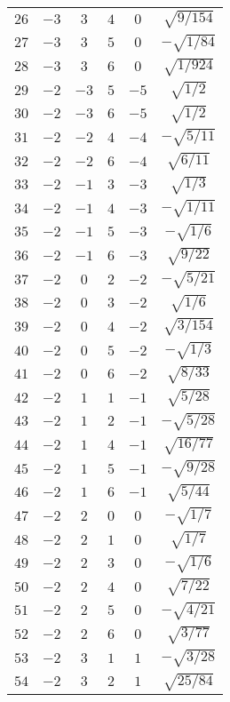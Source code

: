 \begin{table}
\begin{center}
\begin{tabular}{|c|c|c|c|c|c|}
$26$ & $-3$ & $3$ & $4$ & $0$ & $\sqrt{9/154}$ \\ 
$27$ & $-3$ & $3$ & $5$ & $0$ & $-\sqrt{1/84}$ \\ 
$28$ & $-3$ & $3$ & $6$ & $0$ & $\sqrt{1/924}$ \\ 
$29$ & $-2$ & $-3$ & $5$ & $-5$ & $\sqrt{1/2}$ \\ 
$30$ & $-2$ & $-3$ & $6$ & $-5$ & $\sqrt{1/2}$ \\ 
$31$ & $-2$ & $-2$ & $4$ & $-4$ & $-\sqrt{5/11}$ \\ 
$32$ & $-2$ & $-2$ & $6$ & $-4$ & $\sqrt{6/11}$ \\ 
$33$ & $-2$ & $-1$ & $3$ & $-3$ & $\sqrt{1/3}$ \\ 
$34$ & $-2$ & $-1$ & $4$ & $-3$ & $-\sqrt{1/11}$ \\ 
$35$ & $-2$ & $-1$ & $5$ & $-3$ & $-\sqrt{1/6}$ \\ 
$36$ & $-2$ & $-1$ & $6$ & $-3$ & $\sqrt{9/22}$ \\ 
$37$ & $-2$ & $0$ & $2$ & $-2$ & $-\sqrt{5/21}$ \\ 
$38$ & $-2$ & $0$ & $3$ & $-2$ & $\sqrt{1/6}$ \\ 
$39$ & $-2$ & $0$ & $4$ & $-2$ & $\sqrt{3/154}$ \\ 
$40$ & $-2$ & $0$ & $5$ & $-2$ & $-\sqrt{1/3}$ \\ 
$41$ & $-2$ & $0$ & $6$ & $-2$ & $\sqrt{8/33}$ \\ 
$42$ & $-2$ & $1$ & $1$ & $-1$ & $\sqrt{5/28}$ \\ 
$43$ & $-2$ & $1$ & $2$ & $-1$ & $-\sqrt{5/28}$ \\ 
$44$ & $-2$ & $1$ & $4$ & $-1$ & $\sqrt{16/77}$ \\ 
$45$ & $-2$ & $1$ & $5$ & $-1$ & $-\sqrt{9/28}$ \\ 
$46$ & $-2$ & $1$ & $6$ & $-1$ & $\sqrt{5/44}$ \\ 
$47$ & $-2$ & $2$ & $0$ & $0$ & $-\sqrt{1/7}$ \\ 
$48$ & $-2$ & $2$ & $1$ & $0$ & $\sqrt{1/7}$ \\ 
$49$ & $-2$ & $2$ & $3$ & $0$ & $-\sqrt{1/6}$ \\ 
$50$ & $-2$ & $2$ & $4$ & $0$ & $\sqrt{7/22}$ \\ 
$51$ & $-2$ & $2$ & $5$ & $0$ & $-\sqrt{4/21}$ \\ 
$52$ & $-2$ & $2$ & $6$ & $0$ & $\sqrt{3/77}$ \\ 
$53$ & $-2$ & $3$ & $1$ & $1$ & $-\sqrt{3/28}$ \\ 
$54$ & $-2$ & $3$ & $2$ & $1$ & $\sqrt{25/84}$ \\ 

\end{tabular}
\end{center}
\end{table}
